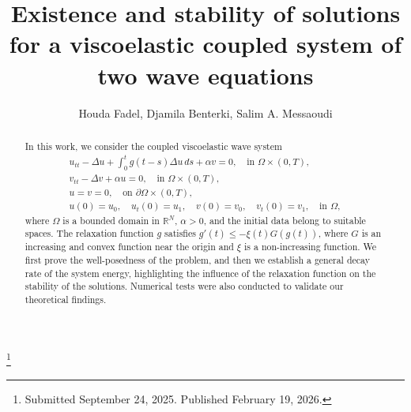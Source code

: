 \documentclass[reqno]{amsart}
\begin{document}
\title[\hfilneg EJDE-2026/16\hfil
Viscoelastic coupled system of two wave equations]
{Existence and stability of solutions for a viscoelastic coupled
system of two wave equations}

\author[H. Fadel, D. Benterki, S. A. Messaoudi \hfil EJDE-2026/16\hfilneg]
{Houda Fadel, Djamila Benterki, Salim A. Messaoudi}

\address{Houda Fadel \newline
Laboratory of Mathematical Analysis and Applications,
Department of Mathematics,
University Mohamed El Bachir El Ibrahimi,
Bordj Bou Arreridj, Algeria}

\address{Djamila Benterki \newline
Laboratory of Mathematical Analysis and Applications,
Department of Mathematics,
University Mohamed El Bachir El Ibrahimi,
Bordj Bou Arreridj, Algeria}

\address{Salim A. Messaoudi
Department of Mathematics,
College of Sciences,
University of Sharjah, Sharjah, UAE}

\thanks{Submitted September 24, 2025. Published February 19, 2026.}

\begin{abstract}
In this work, we consider the coupled viscoelastic wave system
\begin{gather*}
u_{tt} - \Delta u + \int_0^t g(t - s) \Delta u \, ds + \alpha v = 0, \quad \text{in } \Omega \times (0, T), \\
v_{tt} - \Delta v + \alpha u = 0, \quad \text{in } \Omega \times (0, T), \\
u = v = 0, \quad \text{on } \partial \Omega \times (0, T), \\
u(0) = u_0, \quad  u_t(0) = u_1, \quad v(0) = v_0, \quad v_t(0) = v_1, \quad \text{in } \Omega,
\end{gather*}
where \( \Omega \) is a bounded domain in \( \mathbb{R}^N \), \( \alpha > 0 \), and
the initial data belong to suitable spaces.
The relaxation function \( g \) satisfies \( g'(t) \leq -\xi(t) G(g(t)) \), where
$G$ is an increasing and convex function near the origin and
\(\xi\) is a non-increasing function.
We first prove the well-posedness of the problem, and then we establish a general
decay rate of the system energy, highlighting the influence of the
relaxation function on the stability  of the solutions.
Numerical tests were also conducted  to validate our theoretical findings.
\end{abstract}
\end{document}
